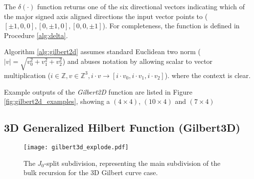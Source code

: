 %
%
%

The $\delta(\cdot)$ function returns one of the six directional vectors indicating which of
the major signed axis aligned directions the input vector points to ($[\pm1,0,0], [0,\pm1,0],[0,0,\pm1]$).
For completeness, the function is defined in Procedure \ref{alg:delta}.

Algorithm \ref{alg:gilbert2d} assumes standard Euclidean two norm ($|v| = \sqrt{v_0^2 + v_1^2 + v_2^2}$)
and abuses notation by allowing scalar to vector multiplication ($i \in \mathbb{Z}, v \in \mathbb{Z}^3, i \cdot v \to [ i \cdot v_0, i \cdot v_1, i \cdot v_2 ]$).
where the context is clear.

Example outputs of the \textit{Gilbert2D} function are listed in Figure \ref{fig:gilbert2d_examples}, showing a $(4 \times 4)$, $(10 \times 4)$ and $(7 \times 4)$


\subsection{3D Generalized Hilbert Function (Gilbert3D)}

\begin{figure}[h]
  \centering
  \texttt{[image: gilbert3d\_explode.pdf]}
  \caption{ The $J_0$-split subdivision, representing the main subdivision of the bulk recursion for the 3D Gilbert curve case. }
  \label{fig:gilbert3DJSplit}
\end{figure}


